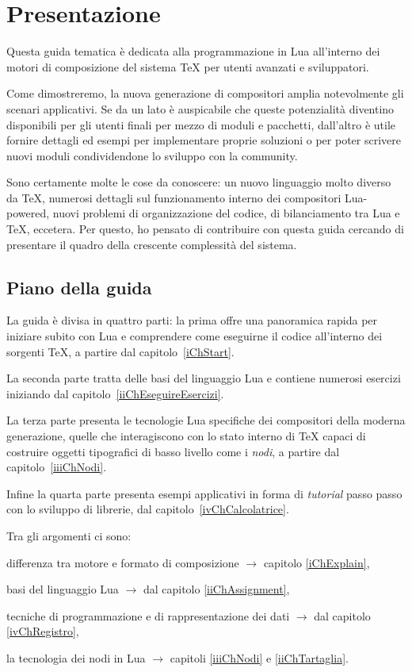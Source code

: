 

\chapter{Presentazione}

Questa guida tematica è dedicata alla programmazione in Lua all'interno dei
motori di composizione del sistema \TeX{} per utenti avanzati e sviluppatori.

Come dimostreremo, la nuova generazione di compositori amplia notevolmente gli
scenari applicativi. Se da un lato è auspicabile che queste potenzialità
diventino disponibili per gli utenti finali per mezzo di moduli e pacchetti,
dall'altro è utile fornire dettagli ed esempi per implementare proprie soluzioni
o per poter scrivere nuovi moduli condividendone lo sviluppo con la community.

Sono certamente molte le cose da conoscere: un nuovo linguaggio molto diverso da
\TeX{}, numerosi dettagli sul funzionamento interno dei compositori Lua-powered,
nuovi problemi di organizzazione del codice, di bilanciamento tra Lua e \TeX,
eccetera. Per questo, ho pensato di contribuire con questa guida cercando di
presentare il quadro della crescente complessità del sistema.


\section{Piano della guida}

La guida è divisa in quattro parti: la prima offre una panoramica rapida per
iniziare subito con Lua e comprendere come eseguirne il codice all'interno dei
sorgenti \TeX{}, a partire dal capitolo~\ref{iChStart}.

La seconda parte tratta delle basi del linguaggio Lua e contiene numerosi
esercizi iniziando dal capitolo~\ref{iiChEseguireEsercizi}.

La terza parte presenta le tecnologie Lua specifiche dei compositori della
moderna generazione, quelle che interagiscono con lo stato interno di \TeX{}
capaci di costruire oggetti tipografici di basso livello come i \emph{nodi}, a
partire dal capitolo~\ref{iiiChNodi}.

Infine la quarta parte presenta esempi applicativi in forma di \emph{tutorial}
passo passo con lo sviluppo di librerie, dal capitolo~\ref{ivChCalcolatrice}.

Tra gli argomenti ci sono:
\begin{compactitemize}
\item differenza tra motore e formato di composizione \( \to \) capitolo
\ref{iChExplain},
\item basi del linguaggio Lua \( \to \) dal capitolo \ref{iiChAssignment},
\item tecniche di programmazione e di rappresentazione dei dati \( \to \) dal
capitolo \ref{ivChRegistro},
\item la tecnologia dei nodi in Lua \( \to \) capitoli \ref{iiiChNodi} e
\ref{iiChTartaglia}.
\end{compactitemize}


